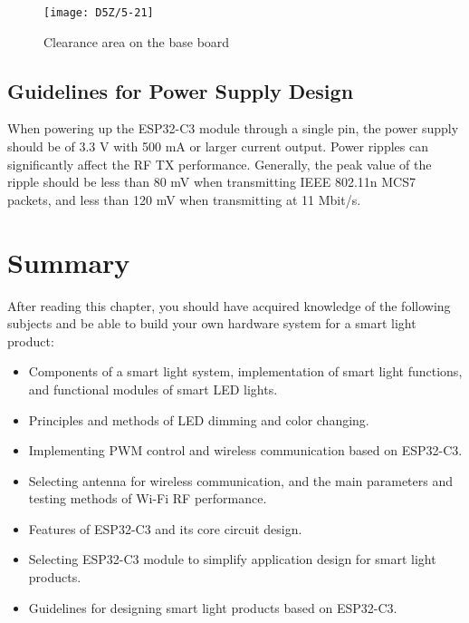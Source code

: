 \documentclass[a4paper,12pt]{book}
\begin{document}
\begin{figure}[h!]
    \centering
    \texttt{[image: D5Z/5-21]}
    \caption{Clearance area on the base board}
\end{figure}

\subsection{Guidelines for Power Supply Design}
When powering up the ESP32-C3 module through a single pin, the power supply should be of 3.3 V with 500 mA or larger current output. Power ripples can significantly affect the RF TX performance. Generally, the peak value of the ripple should be less than 80 mV when transmitting IEEE 802.11n MCS7 packets, and less than 120 mV when transmitting at 11 Mbit/s.

\section{Summary}
After reading this chapter, you should have acquired knowledge of the following subjects and be able to build your own hardware system for a smart light product:

\begin{itemize}[noitemsep]
    \item Components of a smart light system, implementation of smart light functions, and functional modules of smart LED lights.
    \item Principles and methods of LED dimming and color changing.
    \item Implementing PWM control and wireless communication based on ESP32-C3.
    \item Selecting antenna for wireless communication, and the main parameters and testing methods of Wi-Fi RF performance.
    \item Features of ESP32-C3 and its core circuit design.
    \item Selecting ESP32-C3 module to simplify application design for smart light products.
    \item Guidelines for designing smart light products based on ESP32-C3.
\end{itemize}
\end{document}
